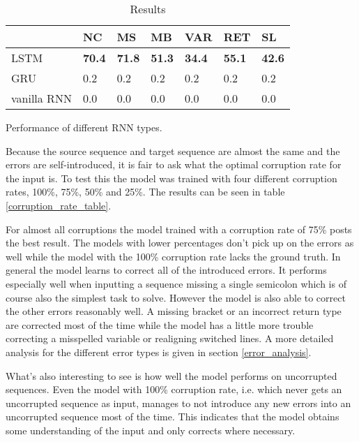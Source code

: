 \begin{table}[t]
\vspace*{5mm}
\newline
\begin{subtable}{\linewidth}\centering
{\begin{tabular}{ | m{2cm} | m{1cm} | m{1cm} | m{1cm} | m{1cm} | m{1cm} | m{1cm} | }
  \hline
  & NC & MS & MB & VAR & RET & SL \\
  \hline
  \hline
  LSTM & \textbf{70.4} & \textbf{71.8} & \textbf{51.3} & \textbf{34.4} & \textbf{55.1} & \textbf{42.6} \\
  \hline
  GRU & 0.2 & 0.2 & 0.2 & 0.2 & 0.2 & 0.2 \\
  \hline
  vanilla RNN & 0.0 & 0.0 & 0.0 & 0.0 & 0.0 & 0.0 \\
  \hline
\end{tabular}}
\caption{Performance of different RNN types.}\label{rnn_type_table}
\end{subtable}
\caption{Results}
\end{table}

Because the source sequence and target sequence are almost the same and the errors are self-introduced, it is fair to ask what the optimal corruption rate for the input is. To test this the model was trained with four different corruption rates, 100\%, 75\%, 50\% and 25\%. The results can be seen in table \ref{corruption_rate_table}.

For almost all corruptions the model trained with a corruption rate of 75\% posts the best result. The models with lower percentages don't pick up on the errors as well while the model with the 100\% corruption rate lacks the ground truth. In general the model learns to correct all of the introduced errors. It performs especially well when inputting a sequence missing a single semicolon which is of course also the simplest task to solve. However the model is also able to correct the other errors reasonably well. A missing bracket or an incorrect return type are corrected most of the time while the model has a little more trouble correcting a misspelled variable or realigning switched lines. A more detailed analysis for the different error types is given in section \ref{error_analysis}.

What's also interesting to see is how well the model performs on uncorrupted sequences. Even the model with 100\% corruption rate, i.e. which never gets an uncorrupted sequence as input, manages to not introduce any new errors into an uncorrupted sequence most of the time. This indicates that the model obtains some understanding of the input and only corrects where necessary.

